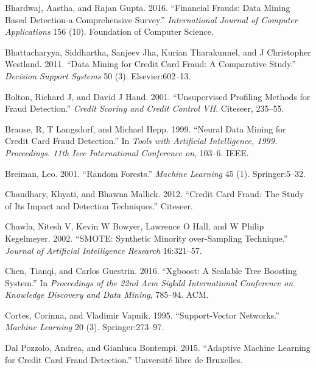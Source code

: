 \documentclass[12pt,]{article}
\begin{document}
\leavevmode\hypertarget{ref-bhardwaj2016financial}{}%
Bhardwaj, Aastha, and Rajan Gupta. 2016. ``Financial Frauds: Data Mining
Based Detection-a Comprehensive Survey.'' \emph{International Journal of
Computer Applications} 156 (10). Foundation of Computer Science.

\leavevmode\hypertarget{ref-bhattacharyya2011data}{}%
Bhattacharyya, Siddhartha, Sanjeev Jha, Kurian Tharakunnel, and J
Christopher Westland. 2011. ``Data Mining for Credit Card Fraud: A
Comparative Study.'' \emph{Decision Support Systems} 50 (3).
Elsevier:602--13.

\leavevmode\hypertarget{ref-bolton2001unsupervised}{}%
Bolton, Richard J, and David J Hand. 2001. ``Unsupervised Profiling
Methods for Fraud Detection.'' \emph{Credit Scoring and Credit Control
VII}. Citeseer, 235--55.

\leavevmode\hypertarget{ref-brause1999neural}{}%
Brause, R, T Langsdorf, and Michael Hepp. 1999. ``Neural Data Mining for
Credit Card Fraud Detection.'' In \emph{Tools with Artificial
Intelligence, 1999. Proceedings. 11th Ieee International Conference on},
103--6. IEEE.

\leavevmode\hypertarget{ref-breiman2001random}{}%
Breiman, Leo. 2001. ``Random Forests.'' \emph{Machine Learning} 45 (1).
Springer:5--32.

\leavevmode\hypertarget{ref-chaudhary2012credit}{}%
Chaudhary, Khyati, and Bhawna Mallick. 2012. ``Credit Card Fraud: The
Study of Its Impact and Detection Techniques.'' Citeseer.

\leavevmode\hypertarget{ref-chawla2002smote}{}%
Chawla, Nitesh V, Kevin W Bowyer, Lawrence O Hall, and W Philip
Kegelmeyer. 2002. ``SMOTE: Synthetic Minority over-Sampling Technique.''
\emph{Journal of Artificial Intelligence Research} 16:321--57.

\leavevmode\hypertarget{ref-chen2016xgboost}{}%
Chen, Tianqi, and Carlos Guestrin. 2016. ``Xgboost: A Scalable Tree
Boosting System.'' In \emph{Proceedings of the 22nd Acm Sigkdd
International Conference on Knowledge Discovery and Data Mining},
785--94. ACM.

\leavevmode\hypertarget{ref-cortes1995support}{}%
Cortes, Corinna, and Vladimir Vapnik. 1995. ``Support-Vector Networks.''
\emph{Machine Learning} 20 (3). Springer:273--97.

\leavevmode\hypertarget{ref-dal2015adaptive}{}%
Dal Pozzolo, Andrea, and Gianluca Bontempi. 2015. ``Adaptive Machine
Learning for Credit Card Fraud Detection.'' Université libre de
Bruxelles.
\end{document}
